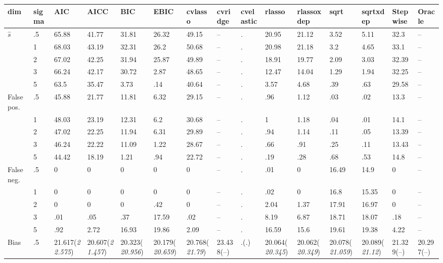 \documentclass{article}
\begin{document}
\begin{table}[tbp] \centering
{}

{\tiny
\begin{tabularx}{\textwidth}{lCCCCCCCCCCCCCC}

\toprule
{dim}&{sigma}&{AIC}&{AICC}&{BIC}&{EBIC}&{cvlasso}&{cvridge}&{cvelastic}&{rlasso}&{rlassoxdep}&{sqrt}&{sqrtxdep}&{Stepwise}&{Oracle} \tabularnewline
\midrule\addlinespace[1.5ex]
$\hat{s}$&.5&65.88&41.77&31.81&26.32&49.15&--&.&20.95&21.12&3.52&5.11&32.3&-- \tabularnewline
&1&68.03&43.19&32.31&26.2&50.68&--&.&20.98&21.18&3.2&4.65&33.1&-- \tabularnewline
&2&67.02&42.25&31.94&25.87&49.89&--&.&18.91&19.77&2.09&3.03&32.39&-- \tabularnewline
&3&66.24&42.17&30.72&2.87&48.65&--&.&12.47&14.04&1.29&1.94&32.25&-- \tabularnewline
&5&63.5&35.47&3.73&.14&40.64&--&.&3.57&4.68&.39&.63&29.58&-- \tabularnewline
\midrule False pos.&.5&45.88&21.77&11.81&6.32&29.15&--&.&.96&1.12&.03&.02&13.3&-- \tabularnewline
&1&48.03&23.19&12.31&6.2&30.68&--&.&1&1.18&.04&.01&14.1&-- \tabularnewline
&2&47.02&22.25&11.94&6.31&29.89&--&.&.94&1.14&.11&.05&13.39&-- \tabularnewline
&3&46.24&22.22&11.09&1.22&28.67&--&.&.66&.91&.25&.11&13.43&-- \tabularnewline
&5&44.42&18.19&1.21&.94&22.72&--&.&.19&.28&.68&.53&14.8&-- \tabularnewline
\midrule False neg.&.5&0&0&0&0&0&--&.&.01&0&16.49&14.9&0&-- \tabularnewline
&1&0&0&0&0&0&--&.&.02&0&16.8&15.35&0&-- \tabularnewline
&2&0&0&0&.42&0&--&.&2.04&1.37&17.91&16.97&0&-- \tabularnewline
&3&.01&.05&.37&17.59&.02&--&.&8.19&6.87&18.71&18.07&.18&-- \tabularnewline
&5&.92&2.72&16.93&19.86&2.09&--&.&16.59&15.6&19.61&19.38&4.22&-- \tabularnewline
\midrule Bias&.5&21.617\newline (\emph{22.575})&20.607\newline (\emph{21.457})&20.323\newline (\emph{20.956})&20.179\newline (\emph{20.659})&20.768\newline (\emph{21.79})&23.438\newline (--)&.\newline (\emph{.})&20.064\newline (\emph{20.345})&20.062\newline (\emph{20.349})&20.078\newline (\emph{21.059})&20.089\newline (\emph{21.12})&21.329\newline (--)&20.297\newline (--) \tabularnewline

\end{tabularx}}
\end{table}
\end{document}
